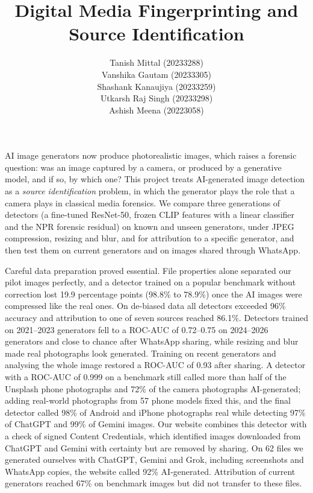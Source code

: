 \documentclass{mnnit}
\begin{document}
\title{Digital Media Fingerprinting and Source Identification}
\author{Tanish Mittal (20233288)\\
Vanshika Gautam (20233305)\\
Shashank Kanaujiya (20233259)\\
Utkarsh Raj Singh (20233298)\\
Ashish Meena (20223058)}

\beforepreface

{\renewcommand{\baselinestretch}{1.1}\selectfont
AI image generators now produce photorealistic images, which raises a
forensic question: was an image captured by a camera, or produced by a
generative model, and if so, by which one? This project treats
AI-generated image detection as a \emph{source identification} problem,
in which the generator plays the role that a camera plays in classical
media forensics. We compare three generations of detectors (a fine-tuned
\mbox{ResNet-50}, frozen CLIP features with a linear classifier and the NPR
forensic residual) on known and unseen generators, under JPEG
compression, resizing and blur, and for attribution to a specific
generator, and then test them on current generators and on images shared
through WhatsApp.

Careful data preparation proved essential. File properties alone
separated our pilot images perfectly, and a detector trained on a
popular benchmark without correction lost 19.9 percentage points
(98.8\% to 78.9\%) once the AI images were compressed like the real
ones. On de-biased data all detectors exceeded 96\% accuracy and
attribution to one of seven sources reached 86.1\%. Detectors trained on
2021--2023 generators fell to a \mbox{ROC-AUC} of 0.72--0.75 on 2024--2026
generators and close to chance after WhatsApp sharing, while resizing
and blur made real photographs look generated. Training on recent
generators and analysing the whole image restored a \mbox{ROC-AUC} of 0.93 after
sharing. A detector with a \mbox{ROC-AUC} of 0.999 on a benchmark still called
more than half of the Unsplash phone photographs and 72\% of the camera
photographs AI-generated; adding real-world
photographs from 57 phone models fixed this, and the final detector
called 98\% of Android and iPhone photographs real while detecting 97\%
of ChatGPT and 99\% of Gemini images. Our website combines this detector
with a check of signed Content Credentials, which identified images
downloaded from ChatGPT and Gemini with certainty but are removed by
sharing. On 62 files we generated ourselves with ChatGPT, Gemini and
Grok, including screenshots and WhatsApp copies, the website called 92\%
AI-generated. Attribution of current generators reached 67\% on
benchmark images but did not transfer to these files.

\par}
\end{document}
